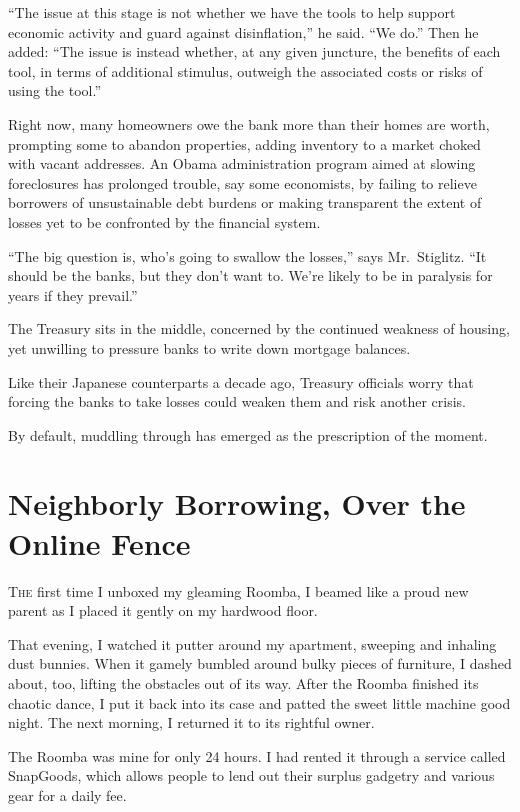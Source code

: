 ﻿\documentclass[12pt]{article}
\begin{document}
``The issue at this stage is not whether we have the tools to help support economic activity and
guard against disinflation,'' he said. ``We do.'' Then he added: ``The issue is instead whether, at
any given juncture, the benefits of each tool, in terms of additional stimulus, outweigh the
associated costs or risks of using the tool.''

Right now, many homeowners owe the bank more than their homes are worth, prompting some to abandon
properties, adding inventory to a market choked with vacant addresses. An Obama administration
program aimed at slowing foreclosures has prolonged trouble, say some economists, by failing to
relieve borrowers of unsustainable debt burdens or making transparent the extent of losses yet to be
confronted by the financial system.

``The big question is, who's going to swallow the losses,'' says Mr.~Stiglitz. ``It should be the
banks, but they don't want to. We're likely to be in paralysis for years if they prevail.''

The Treasury sits in the middle, concerned by the continued weakness of housing, yet unwilling to
pressure banks to write down mortgage balances.

Like their Japanese counterparts a decade ago, Treasury officials worry that forcing the banks to
take losses could weaken them and risk another crisis.

By default, muddling through has emerged as the prescription of the moment.

\pagebreak
\section{Neighborly Borrowing, Over the Online Fence}

\lettrine{T}{he} first time I unboxed my gleaming Roomba, I beamed like a
proud new parent as I placed it gently on my hardwood floor.

That evening, I watched it putter around my apartment, sweeping and inhaling dust bunnies. When it
gamely bumbled around bulky pieces of furniture, I dashed about, too, lifting the obstacles out of
its way. After the Roomba finished its chaotic dance, I put it back into its case and patted the
sweet little machine good night. The next morning, I returned it to its rightful owner.

The Roomba was mine for only 24 hours. I had rented it through a service called SnapGoods, which
allows people to lend out their surplus gadgetry and various gear for a daily fee.
\end{document}
